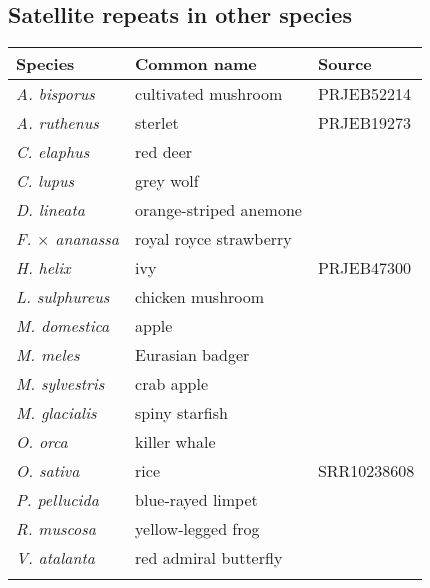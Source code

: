 \documentclass{bioinfo}
\begin{document}
\subsection{Satellite repeats in other species}

\begin{table}[bt]
{\label{tab:dtol}
\begin{tabular}{lll}
\toprule
Species & Common name & Source \\
\midrule
\emph{A. bisporus} & cultivated mushroom & PRJEB52214 \\
\emph{A. ruthenus} & sterlet & PRJEB19273 \\
\emph{C. elaphus} & red deer & \citet{pemberton_genome_2021} \\
\emph{C. lupus} & grey wolf & \citet{sinding_genome_2021}\\
\emph{D. lineata} & orange-striped anemone & \citet{wood_genome_2022} \\
\emph{F. $\times$ ananassa} & royal royce strawberry & \citet{Hon:2020aa} \\
\emph{H. helix} & ivy & PRJEB47300 \\
\emph{L. sulphureus} & chicken mushroom & \citet{wright_genome_2022} \\
\emph{M. domestica} & apple & \citet{konyves_genome_2022} \\
\emph{M. meles} & Eurasian badger & \citet{newman_genome_2022} \\
\emph{M. sylvestris} & crab apple & \citet{ruhsam_genome_2022} \\
\emph{M. glacialis} & spiny starfish & \citet{lawniczak_genome_2021} \\
\emph{O. orca} & killer whale & \citet{foote_genome_2022} \\
\emph{O. sativa} & rice & SRR10238608 \\
\emph{P. pellucida} & blue-rayed limpet & \citet{lawniczak_genome_2022} \\
\emph{R. muscosa} & yellow-legged frog & \citet{Hon:2020aa} \\
\emph{V. atalanta} & red admiral butterfly & \citet{lohse_genome_2021} \\
\botrule
\end{tabular}}{}
\end{table}
\end{document}
